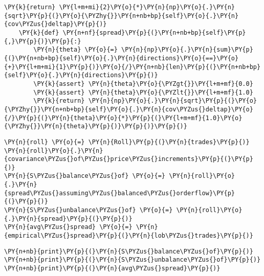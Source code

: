 \documentclass[11pt]{article}
\begin{document}
\begin{tcolorbox}[breakable, size=fbox, boxrule=1pt, pad at break*=1mm,colback=cellbackground, colframe=cellborder]
\begin{Verbatim}[commandchars=\\\{\}]
        \PY{k}{return} \PY{l+m+mi}{2}\PY{o}{*}\PY{n}{np}\PY{o}{.}\PY{n}{sqrt}\PY{p}{(}\PY{o}{\PYZhy{}}\PY{n+nb+bp}{self}\PY{o}{.}\PY{n}{cov\PYZus{}deltap}\PY{p}{)}
    \PY{k}{def} \PY{n+nf}{spread}\PY{p}{(}\PY{n+nb+bp}{self}\PY{p}{,}\PY{p}{)}\PY{p}{:}
        \PY{n}{theta} \PY{o}{=} \PY{n}{np}\PY{o}{.}\PY{n}{sum}\PY{p}{(}\PY{n+nb+bp}{self}\PY{o}{.}\PY{n}{directions}\PY{o}{==}\PY{o}{+}\PY{l+m+mi}{1}\PY{p}{)}\PY{o}{/}\PY{n+nb}{len}\PY{p}{(}\PY{n+nb+bp}{self}\PY{o}{.}\PY{n}{directions}\PY{p}{)}
        \PY{k}{assert} \PY{n}{theta}\PY{o}{\PYZgt{}}\PY{l+m+mf}{0.0}
        \PY{k}{assert} \PY{n}{theta}\PY{o}{\PYZlt{}}\PY{l+m+mf}{1.0}
        \PY{k}{return} \PY{n}{np}\PY{o}{.}\PY{n}{sqrt}\PY{p}{(}\PY{o}{\PYZhy{}}\PY{n+nb+bp}{self}\PY{o}{.}\PY{n}{cov\PYZus{}deltap}\PY{o}{/}\PY{p}{(}\PY{n}{theta}\PY{o}{*}\PY{p}{(}\PY{l+m+mf}{1.0}\PY{o}{\PYZhy{}}\PY{n}{theta}\PY{p}{)}\PY{p}{)}\PY{p}{)}        
\end{Verbatim}
\end{tcolorbox}

    \begin{tcolorbox}[breakable, size=fbox, boxrule=1pt, pad at break*=1mm,colback=cellbackground, colframe=cellborder]
\begin{Verbatim}[commandchars=\\\{\}]
\PY{n}{roll} \PY{o}{=} \PY{n}{Roll}\PY{p}{(}\PY{n}{trades}\PY{p}{)}
\PY{n}{roll}\PY{o}{.}\PY{n}{covariance\PYZus{}of\PYZus{}price\PYZus{}increments}\PY{p}{(}\PY{p}{)}
\PY{n}{S\PYZus{}balance\PYZus{}of} \PY{o}{=} \PY{n}{roll}\PY{o}{.}\PY{n}{spread\PYZus{}assuming\PYZus{}balanced\PYZus{}orderflow}\PY{p}{(}\PY{p}{)}
\PY{n}{S\PYZus{}unbalance\PYZus{}of} \PY{o}{=} \PY{n}{roll}\PY{o}{.}\PY{n}{spread}\PY{p}{(}\PY{p}{)}
\PY{n}{avg\PYZus{}spread} \PY{o}{=} \PY{n}{empirical\PYZus{}spread}\PY{p}{(}\PY{n}{lob\PYZus{}trades}\PY{p}{)}
\end{Verbatim}
\end{tcolorbox}

    \begin{tcolorbox}[breakable, size=fbox, boxrule=1pt, pad at break*=1mm,colback=cellbackground, colframe=cellborder]
\begin{Verbatim}[commandchars=\\\{\}]
\PY{n+nb}{print}\PY{p}{(}\PY{n}{S\PYZus{}balance\PYZus{}of}\PY{p}{)}
\PY{n+nb}{print}\PY{p}{(}\PY{n}{S\PYZus{}unbalance\PYZus{}of}\PY{p}{)}
\PY{n+nb}{print}\PY{p}{(}\PY{n}{avg\PYZus{}spread}\PY{p}{)}
\end{Verbatim}
\end{tcolorbox}
\end{document}
